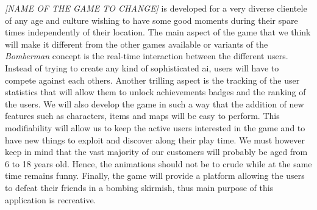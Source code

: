 \textit{[NAME OF THE GAME TO CHANGE]} is developed for a very diverse clientele of any age and culture wishing to have some good moments during their spare times independently of their location. The main aspect of the game that we think will make it different from the other games available or variants of the \textit{Bomberman} concept is the real-time interaction between the different users. Instead of trying to create any kind of sophisticated \gls{ai}, users will have to compete against each others. Another trilling aspect is the tracking of the user statistics that will allow them to unlock achievements badges and the ranking of the users. We will also develop the game in such a way that the addition of new features such as characters, items and maps will be easy to perform. This modifiability will allow us to keep the active users interested in the game and to have new things to exploit and discover along their play time. We must however keep in mind that the vast majority of our customers will probably be aged from 6 to 18 years old. Hence, the animations should not be to crude while at the same time remains funny. Finally, the game will provide a platform allowing the users to defeat their friends in a bombing skirmish, thus main purpose of this application is recreative.
